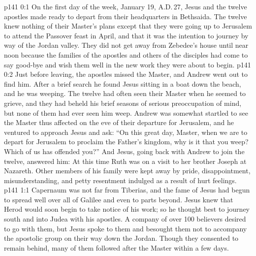 \author{Midwayer Commission}
\vs p141 0:1 On the first day of the week, January 19, A.D.\,27, Jesus and the twelve apostles made ready to depart from their headquarters in Bethsaida. The twelve knew nothing of their Master’s plans except that they were going up to Jerusalem to attend the Passover feast in April, and that it was the intention to journey by way of the Jordan valley. They did not get away from Zebedee’s house until near noon because the families of the apostles and others of the disciples had come to say good\hyp{}bye and wish them well in the new work they were about to begin.
\vs p141 0:2 Just before leaving, the apostles missed the Master, and Andrew went out to find him. After a brief search he found Jesus sitting in a boat down the beach, and he was weeping. The twelve had often seen their Master when he seemed to grieve, and they had beheld his brief seasons of serious preoccupation of mind, but none of them had ever seen him weep. Andrew was somewhat startled to see the Master thus affected on the eve of their departure for Jerusalem, and he ventured to approach Jesus and ask: “On this great day, Master, when we are to depart for Jerusalem to proclaim the Father’s kingdom, why is it that you weep? Which of us has offended you?” And Jesus, going back with Andrew to join the twelve, answered him:  At this time Ruth was on a visit to her brother Joseph at Nazareth. Other members of his family were kept away by pride, disappointment, misunderstanding, and petty resentment indulged as a result of hurt feelings.
\vs p141 1:1 Capernaum was not far from Tiberias, and the fame of Jesus had begun to spread well over all of Galilee and even to parts beyond. Jesus knew that Herod would soon begin to take notice of his work; so he thought best to journey south and into Judea with his apostles. A company of over 100 believers desired to go with them, but Jesus spoke to them and besought them not to accompany the apostolic group on their way down the Jordan. Though they consented to remain behind, many of them followed after the Master within a few days.
